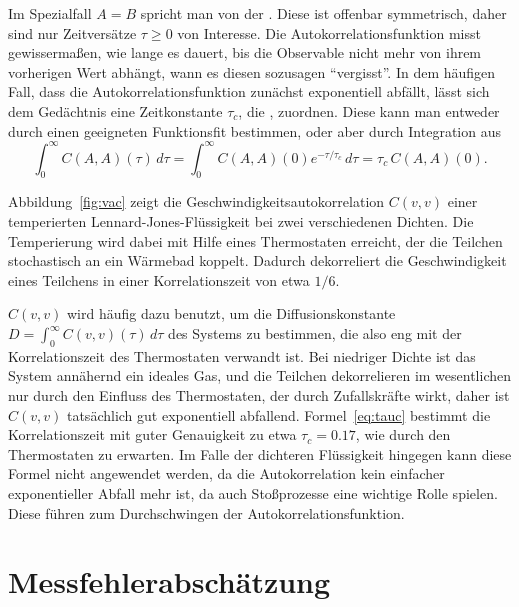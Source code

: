 Im Spezialfall $A=B$ spricht man von der
\emph{}. Diese ist offenbar
symmetrisch, daher sind nur Zeitversätze $\tau\ge 0$ von
Interesse. Die Autokorrelationsfunktion misst gewissermaßen, wie lange
es dauert, bis die Observable nicht mehr von ihrem vorherigen Wert
abhängt, wann es diesen sozusagen "`vergisst"'. In dem häufigen Fall,
dass die Autokorrelationsfunktion zunächst exponentiell abfällt, lässt
sich dem Gedächtnis eine Zeitkonstante $\tau_c$, die
\emph{}, zuordnen. Diese kann man entweder
durch einen geeigneten Funktionsfit bestimmen, oder aber durch
Integration aus
\begin{equation}
  \label{eq:tauc}
  \int_{0}^{\infty} C(A,A)(\tau)\,d\tau = \int_{0}^{\infty}
  C(A,A)(0)e^{-\tau/\tau_c}\,d\tau = \tau_c\,C(A,A)(0).
\end{equation}

Abbildung~\ref{fig:vac} zeigt die Geschwindigkeitsautokorrelation
$C(v,v)$ einer temperierten Lennard-Jones-Flüs\-sig\-ke\-it bei zwei
verschiedenen Dichten. Die Temperierung wird dabei mit Hilfe eines
Thermostaten erreicht, der die Teilchen stochastisch an ein Wärmebad
koppelt. Dadurch dekorreliert die Geschwindigkeit eines Teilchens in
einer Korrelationszeit von etwa $1/6$.

$C(v,v)$ wird häufig dazu benutzt, um die Diffusionskonstante $D =
\int_0^{\infty} C(v,v)(\tau)\, d\tau$ des Systems zu bestimmen, die
also eng mit der Korrelationszeit des Thermostaten verwandt ist.  Bei
niedriger Dichte ist das System annähernd ein ideales Gas, und die
Teilchen dekorrelieren im wesentlichen nur durch den Einfluss des
Thermostaten, der durch Zufallskräfte wirkt, daher ist $C(v,v)$
tatsächlich gut exponentiell abfallend.  Formel~\eqref{eq:tauc}
bestimmt die Korrelationszeit mit guter Genauigkeit zu etwa
$\tau_c=0.17$, wie durch den Thermostaten zu erwarten. Im Falle der
dichteren Flüssigkeit hingegen kann diese Formel nicht angewendet
werden, da die Autokorrelation kein einfacher exponentieller Abfall
mehr ist, da auch Stoßprozesse eine wichtige Rolle spielen. Diese
führen zum Durchschwingen der Autokorrelationsfunktion.

\section{Messfehlerabschätzung}

